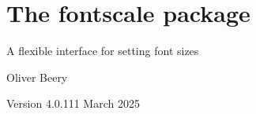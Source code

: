 \documentclass{article}
\begin{document}
\section*{\Large The \textsf{fontscale} package}

A flexible interface for setting font sizes

Oliver Beery

Version 4.0.1\quad{}11 March 2025

\end{document}
